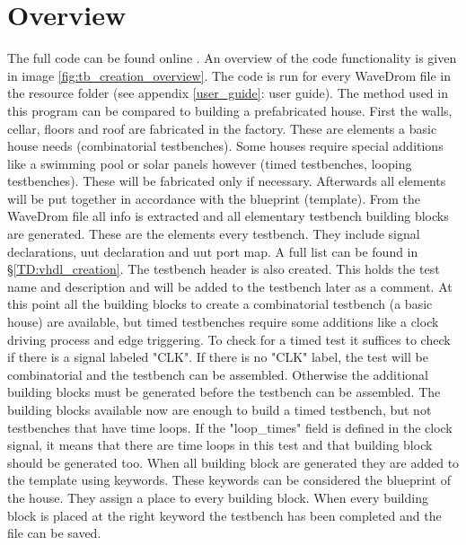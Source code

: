 \section{Overview}
The full code can be found online \cite{github}. An overview of the code functionality is given in image \ref{fig:tb_creation_overview}.\clearpage\noindent
The code is run for every WaveDrom file in the resource folder (see appendix \ref{user_guide}: user guide). The method used in this program can be compared to building a prefabricated house. First the walls, cellar, floors and roof are fabricated in the factory. These are elements a basic house needs (combinatorial testbenches). Some houses require special additions like a swimming pool or solar panels however (timed testbenches, looping testbenches). These will be fabricated only if necessary. Afterwards all elements will be put together in accordance with the blueprint (template).
\npar
From the WaveDrom file all info is extracted and all elementary testbench building blocks are generated. These are the elements every testbench. They include signal declarations, uut declaration and uut port map. A full list can be found in §\ref{TD:vhdl_creation}. The testbench header is also created. This holds the test name and description and will be added to the testbench later as a comment.
\npar
At this point all the building blocks to create a combinatorial testbench (a basic house) are available, but timed testbenches require some additions like a clock driving process and edge triggering. To check for a timed test it suffices to check if there is a signal labeled "CLK". If there is no "CLK" label, the test will be combinatorial and the testbench can be assembled. Otherwise the additional building blocks must be generated before the testbench can be assembled. 
\npar
The building blocks available now are enough to build a timed testbench, but not testbenches that have time loops. If the "loop\_times" field is defined in the clock signal, it means that there are time loops in this test and that building block should be generated too.
\npar
When all building block are generated they are added to the template using keywords. These keywords can be considered the blueprint of the house. They assign a place to every building block. When every building block is placed at the right keyword the testbench has been completed and the file can be saved.\newpage
